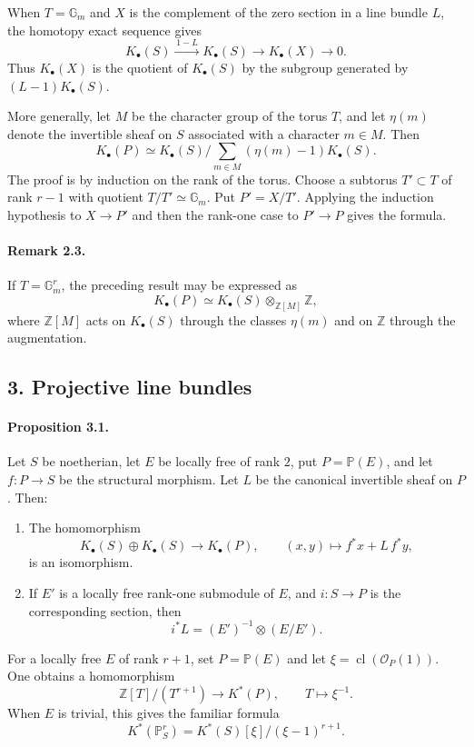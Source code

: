\documentclass[12pt]{article}
\newcommand{\ZZ}{\mathbb Z}
\newcommand{\GG}{\mathbb G}
\newcommand{\bP}{\mathbb P}
\newcommand{\cO}{\mathcal O}
\newcommand{\cl}{\operatorname{cl}}
\newcommand{\xto}[1]{\xrightarrow{#1}}
\newcommand{\longto}{\longrightarrow}
\begin{document}
When $T=\GG_m$ and $X$ is the complement of the zero section in a line bundle $L$, the homotopy exact sequence gives
\[
K_\bullet(S)\xto{\,1-L\,}K_\bullet(S)\longto K_\bullet(X)\longto0.
\]
Thus $K_\bullet(X)$ is the quotient of $K_\bullet(S)$ by the subgroup generated by $(L-1)K_\bullet(S)$.

More generally, let $M$ be the character group of the torus $T$, and let $\eta(m)$ denote the invertible sheaf on $S$ associated with a character $m\in M$. Then
\[
K_\bullet(P)\simeq K_\bullet(S)\Big/\sum_{m\in M}(\eta(m)-1)K_\bullet(S).
\]
The proof is by induction on the rank of the torus. Choose a subtorus $T'\subset T$ of rank $r-1$ with quotient $T/T'\simeq\GG_m$. Put $P'=X/T'$. Applying the induction hypothesis to $X\to P'$ and then the rank-one case to $P'\to P$ gives the formula.

\paragraph{Remark 2.3.}
If $T=\GG_m^r$, the preceding result may be expressed as
\[
K_\bullet(P)\simeq K_\bullet(S)\otimes_{\ZZ[M]}\ZZ,
\]
where $\ZZ[M]$ acts on $K_\bullet(S)$ through the classes $\eta(m)$ and on $\ZZ$ through the augmentation.

\subsection*{3. Projective line bundles}

\paragraph{Proposition 3.1.}
Let $S$ be noetherian, let $E$ be locally free of rank $2$, put $P=\bP(E)$, and let $f:P\to S$ be the structural morphism. Let $L$ be the canonical invertible sheaf on $P$. Then:
\begin{enumerate}[label=\roman*)]
\item The homomorphism
\[
K_\bullet(S)\oplus K_\bullet(S)\longto K_\bullet(P),\qquad
(x,y)\longmapsto f^*x+L\,f^*y,
\]
is an isomorphism.
\item If $E'$ is a locally free rank-one submodule of $E$, and $i:S\to P$ is the corresponding section, then
\[
i^*L=(E')^{-1}\otimes(E/E').
\]
\end{enumerate}

For a locally free $E$ of rank $r+1$, set $P=\bP(E)$ and let $\xi=\cl(\cO_P(1))$. One obtains a homomorphism
\[
\ZZ[T]/(T^{r+1})\longto K^*(P),\qquad T\longmapsto \xi^{-1}.
\]
When $E$ is trivial, this gives the familiar formula
\[
K^*(\bP^r_S)=K^*(S)[\xi]/(\xi-1)^{r+1}.
\]
\end{document}
